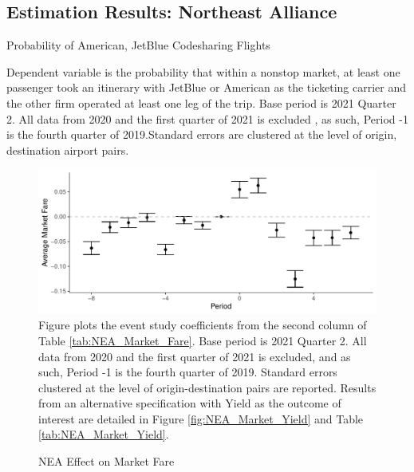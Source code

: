 \documentclass{article}
\begin{document}
\begin{appendices}
	
	\FloatBarrier
	
	\subsection{Estimation Results: Northeast Alliance}

	\begin{table}[h]
	\caption{Probability of American, JetBlue Codesharing Flights}
	\label{tab:NEA_Switch_Prob}
     \vspace{-10mm}
    \begin{center}
	
    \end{center}
         \vspace{-8mm}
	\footnotesize{Dependent variable is the probability that within a nonstop market, at least one passenger took an itinerary with JetBlue or American as the ticketing carrier and the other firm operated at least one leg of the trip. Base period is 2021 Quarter 2. All data from 2020 and the first quarter of 2021 is excluded , as such,  Period -1 is the fourth quarter of 2019.Standard errors are clustered at the level of origin, destination airport pairs.}
\end{table}

        \begin{figure}
		\caption{NEA Effect on Market Fare}
		\label{fig:NEA_Market_Fare}
		\includegraphics[width = \linewidth]{NEA_Market_Fare_Graph.pdf}
		\footnotesize{Figure plots the event study coefficients from the second column of Table \ref{tab:NEA_Market_Fare}. Base period is 2021 Quarter 2. All data from 2020 and the first quarter of 2021 is excluded, and as such, Period -1 is the fourth quarter of 2019. Standard errors clustered at the level of origin-destination pairs are reported. Results from an alternative specification with Yield as the outcome of interest are detailed in Figure \ref{fig:NEA_Market_Yield} and Table \ref{tab:NEA_Market_Yield}.}
	\end{figure}


\end{appendices}
\end{document}
